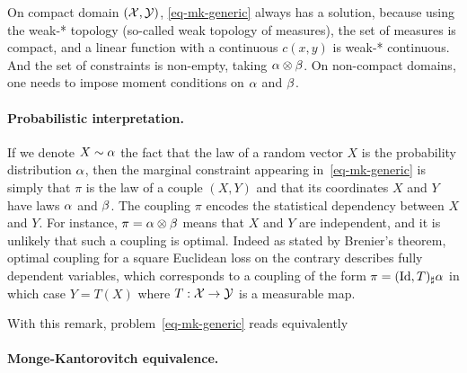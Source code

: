 

On compact domain $(\mathcal{X},\mathcal{Y})$, \eqref{eq-mk-generic} always has a solution, because using the weak-* topology (so-called weak topology of measures), the set of measures is compact, and a linear function with a continuous $c(x,y)$ is weak-* continuous. And the set of constraints is non-empty, taking $\alpha \otimes \beta$. On non-compact domains, one needs to impose moment conditions on $\alpha$ and $\beta$.

\paragraph{Probabilistic interpretation.}

If we denote $X \sim \alpha$ the fact that the law of a random vector $X$ is the probability distribution $\alpha$, then the marginal constraint appearing in~\eqref{eq-mk-generic} is simply that $\pi$ is the law of a couple $(X,Y)$ and that its coordinates $X$ and $Y$ have laws $\alpha$ and $\beta$. The coupling $\pi$ encodes the statistical dependency between $X$ and $Y$. For instance, $\pi = \alpha\otimes \beta$ means that $X$ and $Y$ are independent, and it is unlikely that such a coupling is optimal. Indeed as stated by Brenier's theorem, optimal coupling for a square Euclidean loss on the contrary describes fully dependent variables, which corresponds to a coupling of the form $\pi=(\mathrm{Id},T)_\sharp \alpha$ in which case $Y=T(X)$ where $T: \mathcal{X} \rightarrow \mathcal{Y}$ is a measurable map. 

With this remark, problem~\eqref{eq-mk-generic} reads equivalently 

\paragraph{Monge-Kantorovitch equivalence.}

